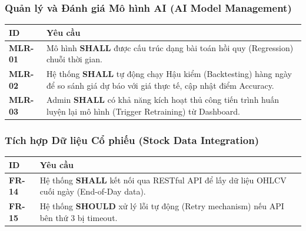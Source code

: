 \documentclass[12pt, a4paper]{article}
\begin{document}
\subsubsection{Quản lý và Đánh giá Mô hình AI (AI Model Management)}

\begin{table}[H]
    \centering
    \renewcommand{\arraystretch}{1.3}
    \begin{tabularx}{\textwidth}{|l|X|}
        \hline
        \rowcolor{gray!10}
        \textbf{ID}     & \textbf{Yêu cầu}                                                                                                                     \\
        \hline
        \textbf{MLR-01} & Mô hình \textbf{SHALL} được cấu trúc dạng bài toán hồi quy (Regression) chuỗi thời gian.                                             \\
        \hline
        \textbf{MLR-02} & Hệ thống \textbf{SHALL} tự động chạy Hậu kiểm (Backtesting) hàng ngày để so sánh giá dự báo với giá thực tế, cập nhật điểm Accuracy. \\
        \hline
        \textbf{MLR-03} & Admin \textbf{SHALL} có khả năng kích hoạt thủ công tiến trình huấn luyện lại mô hình (Trigger Retraining) từ Dashboard.             \\
        \hline
    \end{tabularx}
\end{table}

\subsubsection{Tích hợp Dữ liệu Cổ phiếu (Stock Data Integration)}

\begin{table}[H]
    \centering
    \renewcommand{\arraystretch}{1.3}
    \begin{tabularx}{\textwidth}{|l|X|}
        \hline
        \rowcolor{gray!10}
        \textbf{ID}    & \textbf{Yêu cầu}                                                                                  \\
        \hline
        \textbf{FR-14} & Hệ thống \textbf{SHALL} kết nối qua RESTful API để lấy dữ liệu OHLCV cuối ngày (End-of-Day data). \\
        \hline
        \textbf{FR-15} & Hệ thống \textbf{SHOULD} xử lý lỗi tự động (Retry mechanism) nếu API bên thứ 3 bị timeout.        \\
        \hline
    \end{tabularx}
\end{table}
\end{document}
